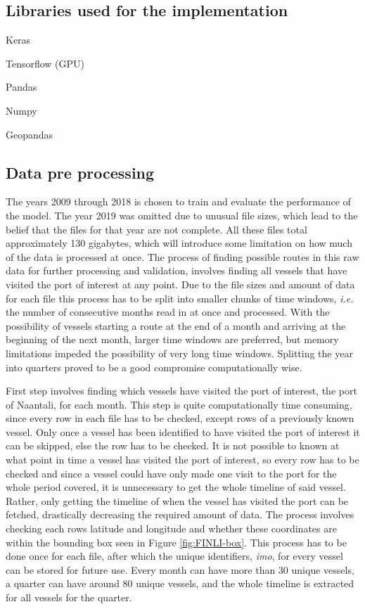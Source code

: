 \documentclass[../main.tex]{subfiles}
\begin{document}
\subsection{Libraries used for the implementation}

Keras

Tensorflow (GPU)

Pandas

Numpy

Geopandas

\subsection{Data pre processing}

The years 2009 through 2018 is chosen to train and evaluate the performance of the model. The year 2019 was omitted due to unusual file sizes, which lead to the belief that the files for that year are not complete. All these files total approximately 130 gigabytes, which will introduce some limitation on how much of the data is processed at once. The process of finding possible routes in this raw data for further processing and validation, involves finding all vessels that have visited the port of interest at any point. Due to the file sizes and amount of data for each file this process has to be split into smaller chunks of time windows, \textit{i.e.} the number of consecutive months read in at once and processed. With the possibility of vessels starting a route at the end of a month and arriving at the beginning of the next month, larger time windows are preferred, but memory limitations impeded the possibility of very long time windows. Splitting the year into quarters proved to be a good compromise computationally wise.

First step involves finding which vessels have visited the port of interest, the port of Naantali, for each month. This step is quite computationally time consuming, since every row in each file has to be checked, except rows of a previously known vessel. Only once a vessel has been identified to have visited the port of interest it can be skipped, else the row has to be checked. It is not possible to known at what point in time a vessel has visited the port of interest, so every row has to be checked and since a vessel could have only made one visit to the port for the whole period covered, it is unnecessary to get the whole timeline of said vessel. Rather, only getting the timeline of when the vessel has visited the port can be fetched, drastically decreasing the required amount of data. The process involves checking each rows latitude and longitude and whether these coordinates are within the bounding box seen in Figure \ref{fig:FINLI-box}. This process has to be done once for each file, after which the unique identifiers, \textit{imo}, for every vessel can be stored for future use. Every month can have more than 30 unique vessels, a quarter can have around 80 unique vessels, and the whole timeline is extracted for all vessels for the quarter.
\end{document}
